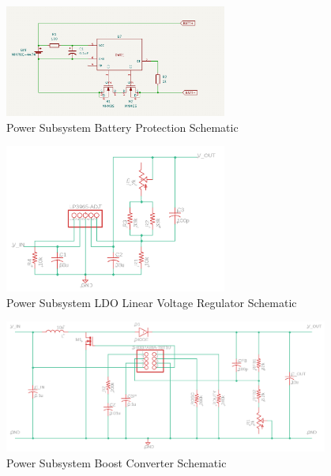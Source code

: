 \documentclass[12pt]{article}
\begin{document}
\begin{figure}[!h]
	\centering
	\includegraphics[width=0.65\textwidth]{BatteryProtection-Schematic.png}
	\caption{Power Subsystem Battery Protection Schematic}
	\label{fig:prot_schem}
\end{figure}

\begin{figure}[!h]
	\centering
	\includegraphics[width=0.65\textwidth]{LDO_Schem.png}
	\caption{Power Subsystem LDO Linear Voltage Regulator Schematic}
	\label{fig:boost_schem}
\end{figure}

\begin{figure}[!h]
	\centering
	\includegraphics[width=0.95\textwidth]{Power_Boost_Schem.png}
	\caption{Power Subsystem Boost Converter Schematic}
	\label{fig:boost_schem}
\end{figure}
\end{document}
